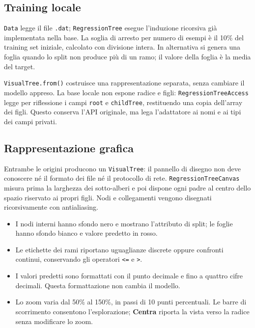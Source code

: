 \subsection*{Training locale}

\texttt{Data} legge il file \texttt{.dat}; \texttt{RegressionTree} esegue
l'induzione ricorsiva già implementata nella base. La soglia di arresto per
numero di esempi è il 10\% del training set iniziale, calcolato con divisione
intera. In alternativa si genera una foglia quando lo split non produce più
di un ramo; il valore della foglia è la media del target.

\texttt{VisualTree.from()} costruisce una rappresentazione separata, senza
cambiare il modello appreso. La base locale non espone radice e figli:
\texttt{RegressionTreeAccess} legge per riflessione i campi \texttt{root} e
\texttt{childTree}, restituendo una copia dell'array dei figli. Questo conserva
l'API originale, ma lega l'adattatore ai nomi e ai tipi dei campi privati.

\clearpage
\subsection*{Rappresentazione grafica}

Entrambe le origini producono un \texttt{VisualTree}: il pannello di disegno
non deve conoscere né il formato dei file né il protocollo di rete.
\texttt{RegressionTreeCanvas} misura prima la larghezza dei sotto-alberi e
poi dispone ogni padre al centro dello spazio riservato ai propri figli.
Nodi e collegamenti vengono disegnati ricorsivamente con antialiasing.

\begin{itemize}
  \item I nodi interni hanno sfondo nero e mostrano l'attributo di split;
        le foglie hanno sfondo bianco e valore predetto in rosso.
  \item Le etichette dei rami riportano uguaglianze discrete oppure confronti
        continui, conservando gli operatori \texttt{<=} e \texttt{>}.
  \item I valori predetti sono formattati con il punto decimale e fino a
        quattro cifre decimali. Questa formattazione non cambia il modello.
  \item Lo zoom varia dal 50\% al 150\%, in passi di 10 punti percentuali.
        Le barre di scorrimento consentono l'esplorazione; \textbf{Centra}
        riporta la vista verso la radice senza modificare lo zoom.
\end{itemize}


